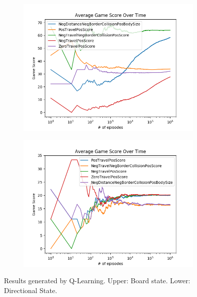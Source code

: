 \documentclass[result.tex]{subfiles}
\begin{document}
    \begin{figure}[ht]
        \centering
        \begin{subfigure}[b]{0.8\linewidth}
            \includegraphics[width=\linewidth]{../images/qlearning/reward/42/reward_qlearning_board_state_average_game_score_over_time.png}
        \end{subfigure}

        \begin{subfigure}[b]{0.8\linewidth}
            \includegraphics[width=\linewidth]{../images/qlearning/reward/42/reward_qlearning_directional_state_average_game_score_over_time.png}
        \end{subfigure}
        \caption{Results generated by Q-Learning. Upper: Board state. Lower: Directional State.}
        \label{fig:reward_result_qlearning}
    \end{figure}
\end{document}
